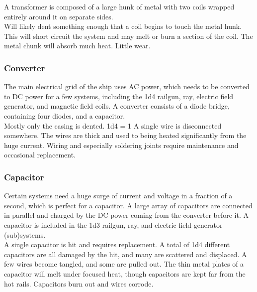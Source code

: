 \documentclass[a4paper]{article}
\begin{document}
A transformer is composed of a large hunk of metal with two coils wrapped entirely around it on separate sides. 
\\ \pbhw
{}
{Will likely dent something enough that a coil begins to touch the metal hunk. This will short circuit the system and may melt or burn a section of the coil.}
{The metal chunk will absorb much heat.}
{Little wear.}


\vspace{-0.5cm} \hspace{-18pt} \subsubsection{Converter} \label{grid_converter} \vspace{-0.2cm}
The main electrical grid of the ship uses AC power, which needs to be converted to DC power for a few systems, including the 1d4 railgun, ray, electric field generator, and magnetic field coils. A converter consists of a diode bridge, containing four diodes, and a capacitor. 
\\ \pbhw
{}
{Mostly only the casing is dented. \newline 1d4 = 1 A single wire is disconnected somewhere.}
{The wires are thick and used to being heated significantly from the huge current.}
{Wiring and especially soldering joints require maintenance and occasional replacement.}


\vspace{-0.5cm} \hspace{-18pt} \subsubsection{Capacitor} \label{grid_capacitor} \vspace{-0.2cm}
Certain systems need a huge surge of current and voltage in a fraction of a second, which is perfect for a capacitor. A large array of capacitors are connected in parallel and charged by the DC power coming from the converter before it. A capacitor is included in the 1d3 railgun, ray, and electric field generator (sub)systems.
\\ \pbhw
{A single capacitor is hit and requires replacement.}
{A total of 1d4 different capacitors are all damaged by the hit, and many are scattered and displaced. A few wires become tangled, and some are pulled out.}
{The thin metal plates of a capacitor will melt under focused heat, though capacitors are kept far from the hot rails.}
{Capacitors burn out and wires corrode.}
\end{document}
